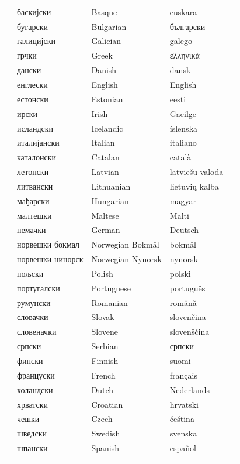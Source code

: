   \centering
    \setlength{\tabcolsep}{2em}
    \begin{tabularx}{\textwidth}{lllll} \toprule\addlinespace
 & баскијски & Basque & euskara\\
  &бугарски & Bulgarian & български \\
  &галицијски & Galician & galego\\
  &грчки & Greek & ελληνικά \\
  &дански & Danish & dansk\\
  &енглески & English & English\\
  &естонски & Estonian & eesti\\
  &ирски & Irish & Gaeilge\\
  &исландски & Icelandic & íslenska \\
  &италијански & Italian & italiano\\
  &каталонски & Catalan & català \\
  &летонски & Latvian &  latviešu valoda\\
  &литвански & Lithuanian & lietuvių kalba\\
  &мађарски & Hungarian & magyar\\
  &малтешки & Maltese & Malti\\
  &немачки & German & Deutsch\\
  &норвешки бокмал & Norwegian Bokmål & bokmål \\
  &норвешки нинорск & Norwegian Nynorsk & nynorsk\\
  &пољски & Polish & polski\\
  &португалски & Portuguese & português\\
  &румунски & Romanian & română\\
  &словачки & Slovak & slovenčina\\
  &словеначки & Slovene & slovenščina\\
  &српски & Serbian & српски \\
  &фински & Finnish & suomi\\
  &француски & French & français\\
  &холандски & Dutch & Nederlands\\
  &хрватски & Croatian & hrvatski\\
  &чешки & Czech & čeština\\
 &шведски & Swedish & svenska\\
 &шпански & Spanish & español\\
   \addlinespace \bottomrule
\end{tabularx}
